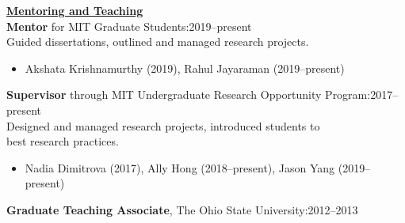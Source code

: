 \documentclass[letterpaper,11pt]{article}
\newcounter{confs}
\newcommand{\talk}[2]{ \begin{tabular}{Aab}\stepcounter{confs}\theconfs.&#1&#2\end{tabular}}
\begin{document}
\underline{\textbf{Mentoring and Teaching}}\\
\textbf{Mentor} for MIT Graduate Students:\hfill2019--present\\
\indent Guided dissertations, outlined and managed research projects.
\begin{itemize}[nosep,label=\textbullet]
\item Akshata Krishnamurthy (2019), Rahul Jayaraman (2019--present)
\end{itemize}
\textbf{Supervisor} through MIT Undergraduate Research Opportunity Program:\hfill2017--present\\
\indent Designed and managed research projects, introduced students to \\
\indent best research practices.
\begin{itemize}[nosep,label=\textbullet]
\item Nadia Dimitrova (2017), Ally Hong (2018--present), Jason Yang (2019--present)
\end{itemize}\textbf{Graduate Teaching Associate}, The Ohio State University:\hfill2012--2013\\
\end{document}
